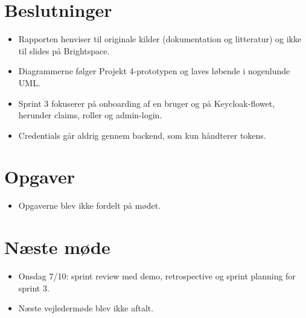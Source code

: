 \documentclass[a4paper,11pt]{article}
\begin{document}
\section*{Beslutninger}

\begin{itemize}
    \item Rapporten henviser til originale kilder (dokumentation og litteratur) og ikke til slides på Brightspace.
    \item Diagrammerne følger Projekt 4-prototypen og laves løbende i nogenlunde UML.
    \item Sprint 3 fokuserer på onboarding af en bruger og på Keycloak-flowet, herunder claims, roller og admin-login.
    \item Credentials går aldrig gennem backend, som kun håndterer tokens.
\end{itemize}

\section*{Opgaver}

\begin{itemize}
    \item Opgaverne blev ikke fordelt på mødet.
\end{itemize}

\section*{Næste møde}

\begin{itemize}
    \item Onsdag 7/10: sprint review med demo, retrospective og sprint planning for sprint 3.
    \item Næste vejledermøde blev ikke aftalt.
\end{itemize}
\end{document}
